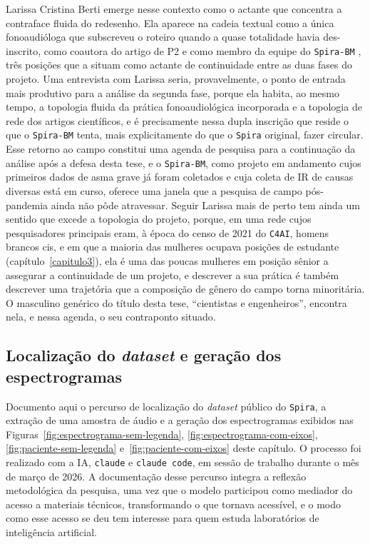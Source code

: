 Larissa Cristina Berti emerge nesse contexto como o actante que concentra a contraface fluida do redesenho. Ela aparece na cadeia textual como a única fonoaudióloga que subscreveu o roteiro quando a quase totalidade havia des-inscrito, como coautora do artigo de P2 \parencite{Gauy2024Discriminant} e como membro da equipe do \texttt{Spira-BM} \parencite{Finger2025SPIRABM}, três posições que a situam como actante de continuidade entre as duas fases do projeto. Uma entrevista com Larissa seria, provavelmente, o ponto de entrada mais produtivo para a análise da segunda fase, porque ela habita, ao mesmo tempo, a topologia fluida da prática fonoaudiológica incorporada e a topologia de rede dos artigos científicos, e é precisamente nessa dupla inscrição que reside o que o \texttt{Spira-BM} tenta, mais explicitamente do que o \texttt{Spira} original, fazer circular. Esse retorno ao campo constitui uma agenda de pesquisa para a continuação da análise após a defesa desta tese, e o \texttt{Spira-BM}, como projeto em andamento cujos primeiros dados de asma grave já foram coletados e cuja coleta de IR de causas diversas está em curso, oferece uma janela que a pesquisa de campo pós-pandemia ainda não pôde atravessar. Seguir Larissa mais de perto tem ainda um sentido que excede a topologia do projeto, porque, em uma rede cujos pesquisadores principais eram, à época do censo de 2021 do \texttt{C4AI}, homens brancos cis, e em que a maioria das mulheres ocupava posições de estudante (capítulo~\ref{capitulo3}), ela é uma das poucas mulheres em posição sênior a assegurar a continuidade de um projeto, e descrever a sua prática é também descrever uma trajetória que a composição de gênero do campo torna minoritária. O masculino genérico do título desta tese, \enquote{cientistas e engenheiros}, encontra nela, e nessa agenda, o seu contraponto situado.

\subsection{Localização do \textit{dataset} e geração dos espectrogramas}
\label{sec:nota-llm}

Documento aqui o percurso de localização do \textit{dataset} público do \texttt{Spira}, a extração de uma amostra de áudio e a geração dos espectrogramas exibidos nas Figuras~\protect\ref{fig:espectrograma-sem-legenda}, \ref{fig:espectrograma-com-eixos}, \ref{fig:paciente-sem-legenda} e~\ref{fig:paciente-com-eixos} deste capítulo. O processo foi realizado com a IA, \texttt{claude} e \texttt{claude code}, em sessão de trabalho durante o mês de março de 2026. A documentação desse percurso integra a reflexão metodológica da pesquisa, uma vez que o modelo participou como mediador do acesso a materiais técnicos, transformando o que tornava acessível, e o modo como esse acesso se deu tem interesse para quem estuda laboratórios de inteligência artificial.

